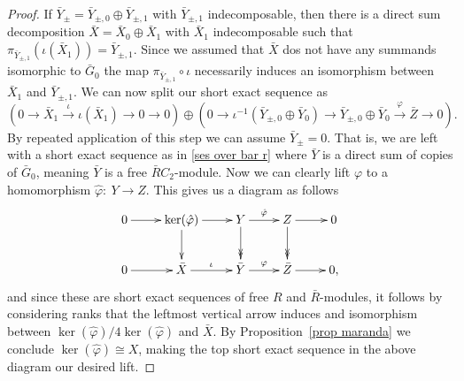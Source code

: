 \documentclass[11pt, a4paper]{amsart}
\theoremstyle{definition}
\theoremstyle{definition}
\begin{document}
\begin{proof}
    If $\bar Y_{\pm} = \bar Y_{\pm,0}\oplus \bar Y_{\pm,1}$ with $\bar Y_{\pm,1}$ indecomposable, then there is a direct sum decomposition $\bar X = \bar X_0\oplus \bar X_1$ with $\bar X_1$ indecomposable such that $\pi_{\bar Y_{\pm,1}}(\iota(\bar X_1))=\bar Y_{\pm,1}$. Since we assumed that $\bar X$ dos not have any summands isomorphic to $\bar G_0$ the map $\pi_{\bar Y_{\pm,1}}\circ \iota$ necessarily induces an isomorphism between $\bar X_1$ and $\bar Y_{\pm,1}$. We can now split our short exact sequence as 
    \begin{equation}
        \left (        0\longrightarrow \bar X_1 \stackrel{\iota}{\longrightarrow} \iota(\bar X_1){\longrightarrow} 0 \longrightarrow 0 \right )\oplus \left(         0\longrightarrow \iota^{-1}(\bar Y_{\pm,0}\oplus \bar Y_0)\longrightarrow \bar Y_{\pm,0}\oplus \bar Y_0  \stackrel{\varphi}{\longrightarrow} \bar Z \longrightarrow 0 \right).
    \end{equation}
    By repeated application of this step we can assume $\bar Y_\pm=0$. That is, we are left with a short exact sequence as in \eqref{ses over bar r} where $\bar Y$ is a direct sum of copies of $\bar G_0$, meaning $\bar Y$ is a free $\bar RC_2$-module. Now we can clearly lift $\varphi$ to a homomorphism $\hat \varphi:\ Y \longrightarrow Z$. This gives us a diagram as follows
    \begin{equation}
        \xymatrix{
            0\ar[r]& \ker(\hat \varphi) \ar[r] \ar@{->}[d] & Y \ar[r]^{\hat \varphi} \ar@{->>}[d]& Z\ar[r] \ar@{->>}[d]&0\\
            0\ar[r]&\bar X \ar[r]^{\iota} &\bar Y \ar[r]^{\varphi}& \bar Z\ar[r]&0,
        }
    \end{equation}
    and since these are short exact sequences of free $R$ and $\bar R$-modules, it follows by considering ranks that the leftmost vertical arrow induces and isomorphism between $\ker(\hat \varphi)/4\ker(\hat \varphi)$ and $\bar X$. By Proposition~\ref{prop maranda} we conclude 
    $\ker(\hat \varphi)\cong X$, making the top short exact sequence in the above diagram our desired lift.
\end{proof}
\end{document}
